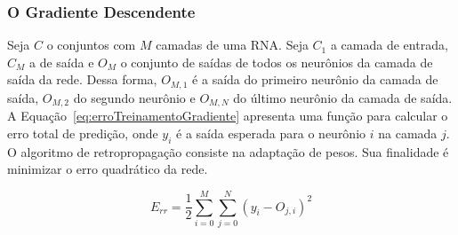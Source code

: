 \subsubsection{O Gradiente Descendente}
\label{sec:RedesNeurais:retropropagação:gradientedescendente}

Seja $C$ o conjuntos com $M$ camadas de uma RNA. Seja $C_1$ a camada de entrada, $C_M$ a de saída e $O_M$ o conjunto de saídas de todos os neurônios da camada de saída da rede. Dessa forma, $O_{M,1}$ é a saída do primeiro neurônio da camada de saída, $O_{M,2}$ do segundo neurônio e $O_{M,N}$ do último neurônio da camada de saída. A Equação~\ref{eq:erroTreinamentoGradiente} apresenta uma função para calcular o erro total de predição, onde $y_i$ é a saída esperada para o neurônio $i$ na camada $j$. O algoritmo de retropropagação consiste na adaptação de pesos. Sua finalidade é minimizar o erro quadrático da rede.

\begin{equation}
\label{eq:fatorAtualizacaoErro}
E_{rr} = \frac{1}{2}\sum_{i = 0}^M \sum_{j = 0}^N  (y_i - O_{j,i})^2
\end{equation}
